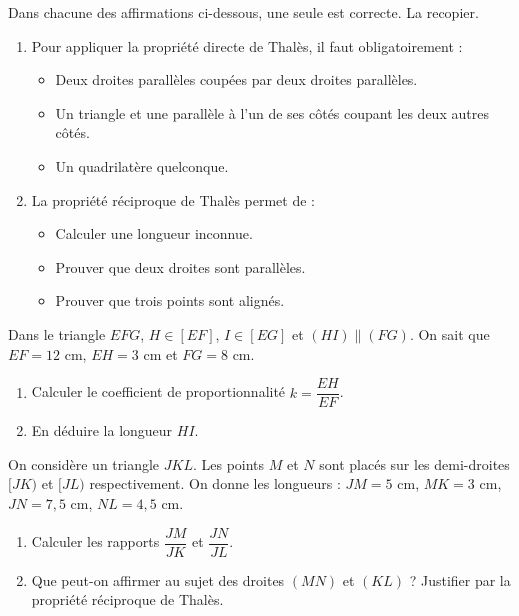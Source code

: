\documentclass[11pt]{article}
\begin{document}
\begin{exercice}
Dans chacune des affirmations ci-dessous, une seule est correcte. La recopier.
\begin{enumerate}
    \item Pour appliquer la propriété directe de Thalès, il faut obligatoirement :
    \begin{itemize}
        \item[A.] Deux droites parallèles coupées par deux droites parallèles.
        \item[B.] Un triangle et une parallèle à l'un de ses côtés coupant les deux autres côtés.
        \item[C.] Un quadrilatère quelconque.
    \end{itemize}
    \item La propriété réciproque de Thalès permet de :
    \begin{itemize}
        \item[A.] Calculer une longueur inconnue.
        \item[B.] Prouver que deux droites sont parallèles.
        \item[C.] Prouver que trois points sont alignés.
    \end{itemize}
\end{enumerate}
\end{exercice}

\begin{exercice}
Dans le triangle $EFG$, $H \in [EF]$, $I \in [EG]$ et $(HI) \parallel (FG)$.
On sait que $EF = 12$ cm, $EH = 3$ cm et $FG = 8$ cm.
\begin{enumerate}
    \item Calculer le coefficient de proportionnalité $k = \dfrac{EH}{EF}$.
    \item En déduire la longueur $HI$.
\end{enumerate}
\end{exercice}

\begin{exercice}
On considère un triangle $JKL$. Les points $M$ et $N$ sont placés sur les demi-droites $[JK)$ et $[JL)$ respectivement.
On donne les longueurs : $JM = 5$ cm, $MK = 3$ cm, $JN = 7,5$ cm, $NL = 4,5$ cm.
\begin{enumerate}
    \item Calculer les rapports $\dfrac{JM}{JK}$ et $\dfrac{JN}{JL}$.
    \item Que peut-on affirmer au sujet des droites $(MN)$ et $(KL)$ ? Justifier par la propriété réciproque de Thalès.
\end{enumerate}
\end{exercice}
\end{document}

